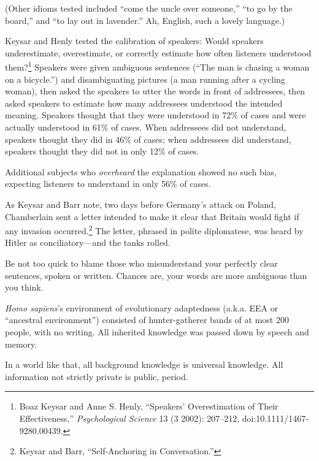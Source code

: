 {
 (Other idioms tested included ``come the uncle
over someone,'' ``to go by the
board,'' and ``to lay out in
lavender.'' Ah, English, such a lovely language.)}

{
 Keysar and Henly tested the calibration of speakers: Would
speakers underestimate, overestimate, or correctly estimate how often
listeners understood them?\footnote{Boaz Keysar and Anne S. Henly,
``Speakers' Overestimation of Their
Effectiveness,'' \textit{Psychological Science} 13 (3
2002): 207--212, doi:10.1111/1467-9280.00439.} Speakers were given
ambiguous sentences (``The man is chasing a woman on a
bicycle.'') and disambiguating pictures (a man
running after a cycling woman), then asked the speakers to utter the
words in front of addressees, then asked speakers to estimate how many
addressees understood the intended meaning. Speakers thought that they
were understood in 72\% of cases and were actually understood in 61\%
of cases. When addressees did not understand, speakers thought they did
in 46\% of cases; when addressees did understand, speakers thought they
did not in only 12\% of cases.}

{
 Additional subjects who \textit{overheard} the explanation showed
no such bias, expecting listeners to understand in only 56\% of cases.}

{
 As Keysar and Barr note, two days before Germany's
attack on Poland, Chamberlain sent a letter intended to make it clear
that Britain would fight if any invasion occurred.\footnote{Keysar and Barr, ``Self-Anchoring in
Conversation.''}
The letter, phrased in polite diplomatese, was heard by Hitler as
conciliatory---and the tanks rolled.}

{
 Be not too quick to blame those who misunderstand your perfectly
clear sentences, spoken or written. Chances are, your words are more
ambiguous than you think.}

\myendsectiontext


\bigskip

\label{inferential_distances}

{
 \textit{Homo sapiens}'s environment of
evolutionary adaptedness (a.k.a. EEA or ``ancestral
environment'') consisted of hunter-gatherer bands of
at most 200 people, with no writing. All inherited knowledge was passed
down by speech and memory. }

{
 In a world like that, all background knowledge is universal
knowledge. All information not strictly private is public, period.}

